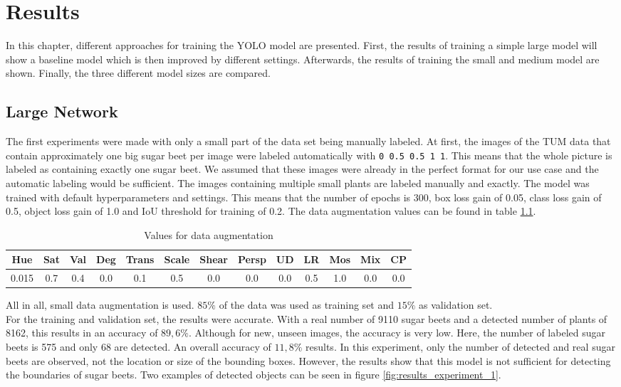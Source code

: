 
\chapter{Results}

In this chapter, different approaches for training the YOLO model are presented. First, the results of training a simple large model will show a baseline model which is then improved by different settings. Afterwards, the results of training the small and medium model are shown. Finally, the three different model sizes are compared.

\section{Large Network}

The first experiments were made with only a small part of the data set being manually labeled. At first, the images of the TUM data that contain approximately one big sugar beet per image were labeled automatically with \texttt{0 0.5 0.5 1 1}. This means that the whole picture is labeled as containing exactly one sugar beet. We assumed that these images were already in the perfect format for our use case and the automatic labeling would be sufficient. The images containing multiple small plants are labeled manually and exactly. The model was trained with default hyperparameters and settings. This means that the number of epochs is 300, box loss gain of 0.05, class loss gain of 0.5, object loss gain of 1.0 and IoU threshold for training of 0.2. The data augmentation values can be found in table \ref{tab:augmentation_exp1}.

\begin{table}[h!]
	\centering
	\begin{tabular}{|c c c c c c c c c c c c c|} 
		\hline
		Hue & Sat & Val & Deg & Trans & Scale & Shear & Persp & UD & LR & Mos & Mix & CP\\ %
		\hline
		0.015 & 0.7 & 0.4 & 0.0 & 0.1 & 0.5 & 0.0 & 0.0 & 0.0 & 0.5 & 1.0 & 0.0 & 0.0 \\
		\hline
	\end{tabular}
	\caption{Values for data augmentation}
	\label{tab:augmentation_exp1}
\end{table}

All in all, small data augmentation is used. $ 85\% $ of the data was used as training set and $ 15\% $ as validation set.\\

For the training and validation set, the results were accurate. With a real number of 9110 sugar beets and a detected number of plants of 8162, this results in an accuracy of $ 89,6\% $. Although for new, unseen images, the accuracy is very low. Here, the number of labeled sugar beets is 575 and only 68 are detected. An overall accuracy of $ 11,8\% $ results. In this experiment, only the number of detected and real sugar beets are observed, not the location or size of the bounding boxes. However, the results show that this model is not sufficient for detecting the boundaries of sugar beets. Two examples of detected objects can be seen in figure \ref{fig:results_experiment_1}.

